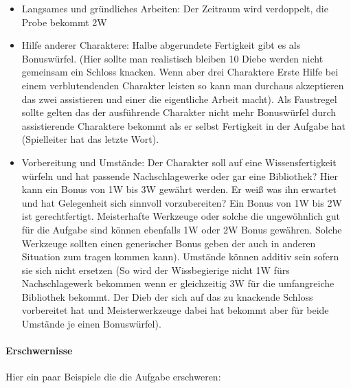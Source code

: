 \documentclass{article}
\begin{document}
\begin{itemize}
\item Langsames und gründliches Arbeiten: Der Zeitraum wird verdoppelt, die Probe bekommt 2W
\item Hilfe anderer Charaktere: Halbe abgerundete Fertigkeit gibt es als Bonuswürfel. (Hier sollte man realistisch bleiben 10 Diebe werden nicht gemeinsam ein Schloss knacken. Wenn aber drei Charaktere Erste Hilfe bei einem verblutendenden Charakter leisten so kann man durchaus akzeptieren das zwei assistieren und einer die eigentliche Arbeit macht). Als Faustregel sollte gelten das der ausführende Charakter nicht mehr Bonuswürfel durch assistierende Charaktere bekommt als er selbst Fertigkeit in der Aufgabe hat (Spielleiter hat das letzte Wort).
\item Vorbereitung und Umstände: Der Charakter soll auf eine Wissensfertigkeit würfeln und hat passende Nachschlagewerke oder gar eine Bibliothek? Hier kann ein Bonus von 1W bis 3W gewährt werden. Er weiß was ihn erwartet und hat Gelegenheit sich sinnvoll vorzubereiten? Ein Bonus von 1W bis 2W ist gerechtfertigt. Meisterhafte Werkzeuge oder solche die ungewöhnlich gut für die Aufgabe sind können ebenfalls 1W oder 2W Bonus gewähren. Solche Werkzeuge sollten einen generischer Bonus geben der auch in anderen Situation zum tragen kommen kann). Umstände können additiv sein sofern sie sich nicht ersetzen (So wird der Wissbegierige nicht 1W fürs Nachschlagewerk bekommen wenn er gleichzeitig 3W für die umfangreiche Bibliothek bekommt. Der Dieb der sich auf das zu knackende Schloss vorbereitet hat und Meisterwerkzeuge dabei hat bekommt aber für beide Umstände je einen Bonuswürfel).
\end{itemize}

\paragraph{Erschwernisse}

Hier ein paar Beispiele die die Aufgabe erschweren:
\end{document}
